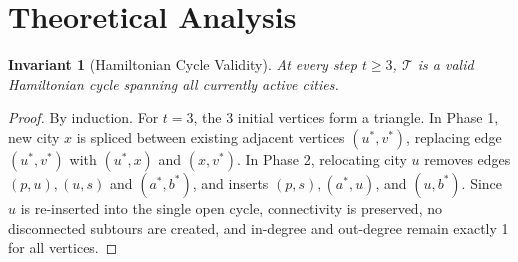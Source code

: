 \documentclass[11pt,a4paper]{article}
\newtheorem{invariant}{Invariant}
\theoremstyle{definition}
\begin{document}
\section{Theoretical Analysis}

\begin{invariant}[Hamiltonian Cycle Validity]
At every step $t \ge 3$, $\mathcal{T}$ is a valid Hamiltonian cycle spanning all currently active cities.
\end{invariant}
\begin{proof}
By induction. For $t=3$, the 3 initial vertices form a triangle. In Phase 1, new city $x$ is spliced between existing adjacent vertices $(u^*, v^*)$, replacing edge $(u^*, v^*)$ with $(u^*, x)$ and $(x, v^*)$. In Phase 2, relocating city $u$ removes edges $(p, u), (u, s)$ and $(a^*, b^*)$, and inserts $(p, s), (a^*, u)$, and $(u, b^*)$. Since $u$ is re-inserted into the single open cycle, connectivity is preserved, no disconnected subtours are created, and in-degree and out-degree remain exactly 1 for all vertices.
\end{proof}
\end{document}
